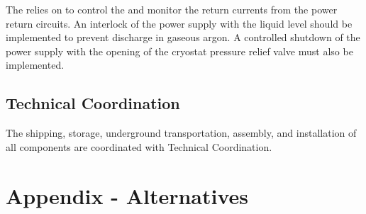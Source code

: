 The  relies on  to control the  and monitor the return currents from the  power return circuits.  An interlock of the  power supply with the liquid level should be implemented to prevent  discharge in gaseous argon.  A controlled shutdown of the  power supply with the opening of the cryostat pressure relief valve must also be implemented.

\subsection{Technical Coordination}
\label{sec:fddp-hv-intfc-to-tc}

The shipping, storage, underground transportation, assembly, and installation of all  components are coordinated with Technical Coordination.




\section{Appendix - Alternatives}






